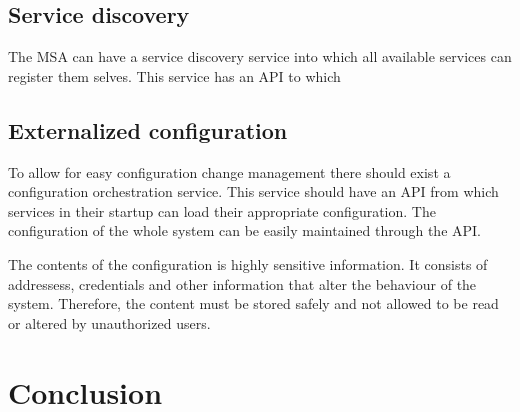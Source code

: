 \subsection{Service discovery}
\begin{sloppypar}
    The MSA can have a service discovery service into which all available services 
    can register them selves. This service has an API to which
\end{sloppypar}

\subsection{Externalized configuration}
\begin{sloppypar}
    To allow for easy configuration change management there should exist a 
    configuration orchestration service. This service should have an API from 
    which services in their startup can load their appropriate configuration. 
    The configuration of the whole system can be easily maintained through the 
    API.

    The contents of the configuration is highly sensitive information. It 
    consists of addressess, credentials and other information that alter 
    the behaviour of the system. Therefore, the content must be stored safely 
    and not allowed to be read or altered by unauthorized users.
\end{sloppypar}





\section{Conclusion}


